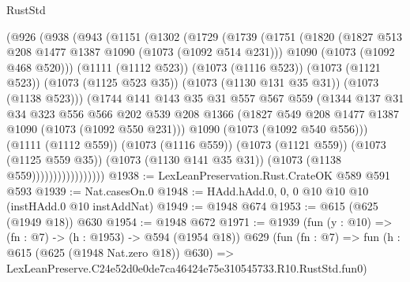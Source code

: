 \begin{lexlean}{RustStd}
\begin{coremodule}
                  (@926
                    (@938
                      (@943
                        (@1151
                          (@1302
                            (@1729
                              (@1739
                                (@1751
                                  (@1820
                                    (@1827 @513 @208 @1477 @1387 @1090 (@1073 (@1092 @514 @231)))
                                    @1090
                                    (@1073 (@1092 @468 @520)))
                                  (@1111 (@1112 @523))
                                  (@1073 (@1116 @523))
                                  (@1073 (@1121 @523))
                                  (@1073 (@1125 @523 @35))
                                  (@1073 (@1130 @131 @35 @31))
                                  (@1073 (@1138 @523)))
                                (@1744
                                  @141
                                  @143
                                  @35
                                  @31
                                  @557
                                  @567
                                  @559
                                  (@1344
                                    @137
                                    @31
                                    @34
                                    @323
                                    @556
                                    @566
                                    @202
                                    @539
                                    @208
                                    @1366
                                    (@1827 @549 @208 @1477 @1387 @1090 (@1073 (@1092 @550 @231)))
                                    @1090
                                    (@1073 (@1092 @540 @556)))
                                  (@1111 (@1112 @559))
                                  (@1073 (@1116 @559))
                                  (@1073 (@1121 @559))
                                  (@1073 (@1125 @559 @35))
                                  (@1073 (@1130 @141 @35 @31))
                                  (@1073 (@1138 @559)))))))))))))))))
@1938 := LexLeanPreservation.Rust.CrateOK @589 @591 @593
@1939 := Nat.casesOn.{0}
@1948 := HAdd.hAdd.{0, 0, 0} @10 @10 @10 (instHAdd.{0} @10 instAddNat)
@1949 := @1948 @674
@1953 := @615 (@625 (@1949 @18)) @630
@1954 := @1948 @672
@1971 := @1939
    (fun (y : @10) => (fn : @7) -> (h : @1953) -> @594 (@1954 @18))
    @629
    (fun (fn : @7) =>
    fun (h : @615 (@625 (@1948 Nat.zero @18)) @630) =>
    LexLeanPreserve.C24e52d0e0de7ca46424e75e310545733.R10.RustStd.fun0)

\end{coremodule}
\end{lexlean}
